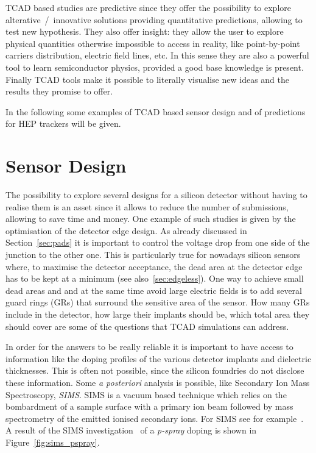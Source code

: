 TCAD based studies are predictive since they offer the possibility to explore alterative~/~innovative 
solutions providing quantitative predictions, allowing to test new hypothesis. 
They also offer insight: they allow the user to explore physical quantities otherwise impossible to 
access in reality, like point-by-point carriers distribution, electric field lines, etc. In this sense they 
are also a powerful tool to learn semiconductor physics, provided a good base knowledge is present.
Finally TCAD tools make it possible to literally visualise new ideas and the results they promise to 
offer.

In the following some examples of TCAD based sensor design and of predictions for HEP
trackers will be given.

\section{Sensor Design}
\label{sec:sensordesign}

The possibility to explore several designs for a silicon detector without having to realise them is 
 an asset since it allows to reduce the number of submissions, allowing to save time 
and money. 
One example of such studies is given by the optimisation of the detector edge design. 
As already discussed in Section~\ref{sec:pads} it is important to control the voltage 
drop from one side of the junction to the other one. This is particularly true for nowadays 
silicon sensors where, to maximise the detector acceptance, the dead area at the 
detector edge has to be kept at a minimum (see also~\ref{sec:edgeless}). One way to achieve 
small dead areas and and at the same time avoid large electric fields is to add several 
guard rings (GRs) that surround the sensitive area of the sensor. How many GRs include in 
the detector, how large their implants should be, which total area they should cover are 
some of the questions that TCAD simulations can address. 

In order for the answers to be really reliable it is important to have access to information 
like the doping profiles of the various detector implants and dielectric thicknesses. 
This is often not possible, since 
the silicon foundries do not disclose these information. Some {\it a posteriori} analysis is possible, 
like Secondary Ion Mass Spectroscopy, {\it SIMS}. SIMS is a vacuum based technique 
which relies on the bombardment of a sample surface with a primary ion 
beam  followed  by  mass  spectrometry  of  the 
 emitted  ionised  secondary  ions.  For SIMS see for example~\cite{dinu:tel-00872318}.
A result of the SIMS investigation~\cite{SIMS} of a {\it p-spray} doping is shown in Figure~\ref{fig:sims_pspray}. 

